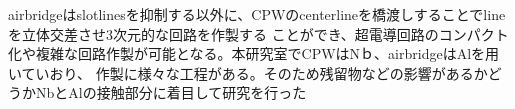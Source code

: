airbridgeはslotlinesを抑制する以外に、CPWのcenterlineを橋渡しすることでlineを立体交差させ3次元的な回路を作製する
ことができ、超電導回路のコンパクト化や複雑な回路作製が可能となる。本研究室でCPWはNｂ、airbridgeはAlを用いていおり、
作製に様々な工程がある。そのため残留物などの影響があるかどうかNbとAlの接触部分に着目して研究を行った
